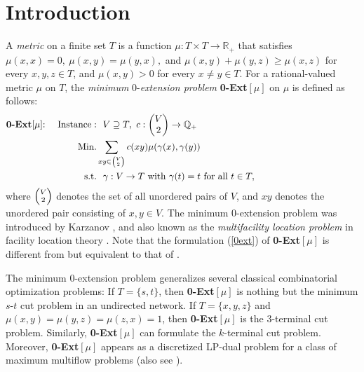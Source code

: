 \documentclass[11pt]{article}
\theoremstyle{definition}
\begin{document}
\section{Introduction}
\label{sec:introduction}
A \textit{metric} on a finite set $T$ is a function $\mu:T\times T\rightarrow \mathbb{R}_{+} $ that satisfies $\mu(x,x)=0,\ \mu(x,y)=\mu(y,x),$ and $\mu(x,y)+\mu(y,z)\geq \mu(x,z)$ for every $x,y,z\in T$, and $\mu(x,y)>0$ for every $x\neq y\in T$. 
For a rational-valued metric  $\mu$ on $T$, the \textit{minimum} 0-\textit{extension problem} \textbf{0-Ext}$[\mu]$ on $\mu$ is defined as follows:
\begin{align}
\label{0ext}
\textbf{0-Ext}[\mu]\mathrm{:\ \ \ \ }
\mathrm{Instance:}&\mathrm{\ \ }V\supseteq T,\ c:\begin{pmatrix}V \\ 2 \\ \end{pmatrix}
\rightarrow \mathbb{Q}_{+}\notag\\
\mathrm{Min.}&\displaystyle\sum_{\tiny xy\in
\begin{pmatrix}V \\2 \\
\end{pmatrix}\normalsize}c(xy)\mu(\gamma(x),\gamma(y)) \notag \\ \mathrm{s.t.}&\mathrm{\ \ }\gamma:V\rightarrow T\  \mathrm{with\ }\gamma(t)=t\mathrm{\ for\ all\ }t\in T,\mathrm{\ \ \ \ \ \ \ \ \ \ \ \ \ \ \ \ \ \ \ \ \ \ \ \ \ \ \ \ \ \ \ \ \ }
\end{align}
where ${\scriptsize\begin{pmatrix}V \\
                     2 \\
      \end{pmatrix}}$ denotes the set of all unordered pairs of $V$,
and $xy$ denotes the unordered pair consisting of $x,y\in V$. The minimum 0-extension problem was introduced by Karzanov \cite{karzanov1998}, and also known as the \textit{multifacility location problem} in facility location theory \cite{tansel1983}. Note that the formulation (\ref{0ext}) of \textbf{0-Ext}$[\mu]$ is different from but equivalent to that of \cite{karzanov1998}. 

The minimum 0-extension problem generalizes several classical combinatorial optimization problems: If $T=\{s,t\}$, then \textbf{0-Ext}$[\mu]$ is nothing but the minimum $s$-$t$ cut problem in an undirected network. If $T=\{x,y,z\}$ and $\mu(x,y)=\mu(y,z)=\mu(z,x)=1$, then \textbf{0-Ext}$[\mu]$ is the $3$-terminal cut problem. Similarly, \textbf{0-Ext}$[\mu]$ can formulate the $k$-terminal cut problem. Moreover, \textbf{0-Ext}$[\mu]$ appears as a discretized LP-dual problem for a class of maximum multiflow problems \cite{karzanov1998pri,karzanov1998} (also see \cite{hirai2009,hirai2011}). 
\end{document}
